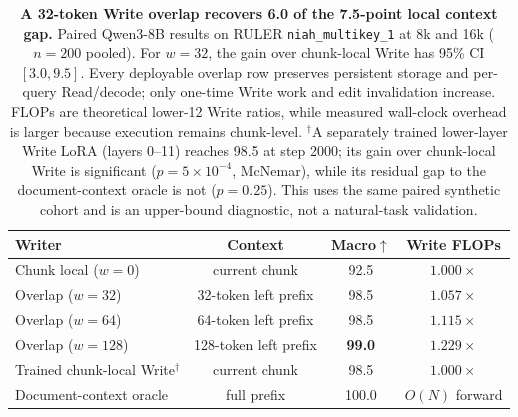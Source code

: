\begin{table}[!htbp]
\centering
\small
\setlength{\tabcolsep}{4pt}
\begin{tabular}{@{}lccc@{}}
\toprule
\textbf{Writer} & \textbf{Context} & \textbf{Macro}$\uparrow$ &
\textbf{Write FLOPs} \\
\midrule
Chunk local ($w{=}0$) & current chunk & 92.5 & $1.000\times$ \\
Overlap ($w{=}32$) & 32-token left prefix & 98.5 & $1.057\times$ \\
Overlap ($w{=}64$) & 64-token left prefix & 98.5 & $1.115\times$ \\
Overlap ($w{=}128$) & 128-token left prefix & \textbf{99.0} & $1.229\times$ \\
Trained chunk-local Write$^\dagger$ & current chunk & 98.5 & $1.000\times$ \\
Document-context oracle & full prefix & 100.0 & $O(N)$ forward \\
\bottomrule
\end{tabular}
\caption{\textbf{A 32-token Write overlap recovers 6.0 of the 7.5-point local
context gap.}
Paired Qwen3-8B results on RULER \texttt{niah\_multikey\_1} at 8k and 16k
($n{=}200$ pooled). For $w{=}32$, the gain over chunk-local Write has 95\% CI
$[3.0,9.5]$. Every deployable overlap row preserves persistent storage and
per-query Read/decode; only one-time Write work and edit invalidation increase.
FLOPs are theoretical lower-12 Write ratios, while measured wall-clock overhead
is larger because execution remains chunk-level.
$^\dagger$A separately trained lower-layer Write LoRA (layers 0--11) reaches
98.5 at step 2000; its gain over chunk-local Write is significant
($p{=}5{\times}10^{-4}$, McNemar), while its residual gap to the
document-context oracle is not ($p{=}0.25$). This uses the same paired synthetic
cohort and is an upper-bound diagnostic, not a natural-task validation.}
\label{tab:write-context}
\end{table}
